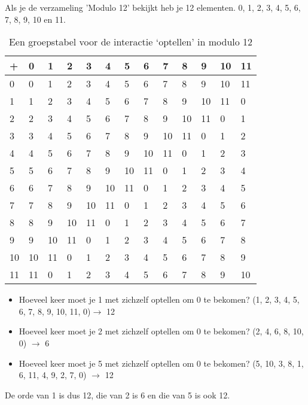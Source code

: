 \documentclass[12pt]{report}
\begin{document}
Als je de verzameling 'Modulo 12' bekijkt heb je 12 elementen. 0, 1, 2, 3, 4, 5, 6, 7, 8, 9, 10 en 11.
\begin{table}[]
\centering
\caption{Een groepstabel voor de interactie `optellen' in modulo 12}
\begin{tabular}{|l|llllllllllll}
\hline
+ & \multicolumn{1}{l|}{0} & \multicolumn{1}{l|}{1} & \multicolumn{1}{l|}{2} & \multicolumn{1}{l|}{3} & \multicolumn{1}{l|}{4} & \multicolumn{1}{l|}{5} & \multicolumn{1}{l|}{6} & \multicolumn{1}{l|}{7} & \multicolumn{1}{l|}{8} & \multicolumn{1}{l|}{9} & \multicolumn{1}{l|}{10} & \multicolumn{1}{l|}{11} \\ \hline
0 & 0 & 1 & 2 & 3 & 4 & 5 & 6 & 7 & 8 & 9 & 10 & 11 \\ \cline{1-1}
1 & 1 & 2 & 3 & 4 & 5 & 6 & 7 & 8 & 9 & 10 & 11 & 0 \\ \cline{1-1}
2 & 2 & 3 & 4 & 5 & 6 & 7 & 8 & 9 & 10 & 11 & 0 & 1 \\ \cline{1-1}
3 & 3 & 4 & 5 & 6 & 7 & 8 & 9 & 10 & 11 & 0 & 1 & 2 \\ \cline{1-1}
4 & 4 & 5 & 6 & 7 & 8 & 9 & 10 & 11 & 0 & 1 & 2 & 3 \\ \cline{1-1}
5 & 5 & 6 & 7 & 8 & 9 & 10 & 11 & 0 & 1 & 2 & 3 & 4 \\ \cline{1-1}
6 & 6 & 7 & 8 & 9 & 10 & 11 & 0 & 1 & 2 & 3 & 4 & 5 \\ \cline{1-1}
7 & 7 & 8 & 9 & 10 & 11 & 0 & 1 & 2 & 3 & 4 & 5 & 6 \\ \cline{1-1}
8 & 8 & 9 & 10 & 11 & 0 & 1 & 2 & 3 & 4 & 5 & 6 & 7 \\ \cline{1-1}
9 & 9 & 10 & 11 & 0 & 1 & 2 & 3 & 4 & 5 & 6 & 7 & 8 \\ \cline{1-1}
10 & 10 & 11 & 0 & 1 & 2 & 3 & 4 & 5 & 6 & 7 & 8 & 9  \\ \cline{1-1}
11 & 11 & 0 & 1 & 2 & 3 & 4 & 5 & 6 & 7 & 8 & 9 & 10 \\ \cline{1-1}
\end{tabular}
\label{table:groepstabel}
\end{table}
\begin{itemize}
 \item Hoeveel keer moet je 1 met zichzelf optellen om 0 te bekomen? (1, 2, 3, 4, 5, 6, 7, 8, 9, 10, 11, 0)$\rightarrow$ 12
 \item Hoeveel keer moet je 2 met zichzelf optellen om 0 te bekomen? (2, 4, 6, 8, 10, 0) $\rightarrow$ 6
 \item Hoeveel keer moet je 5 met zichzelf optellen om 0 te bekomen? (5, 10, 3, 8, 1, 6, 11, 4, 9, 2, 7, 0) $\rightarrow$ 12
\end{itemize}
De orde van 1 is dus 12, die van 2 is 6 en die van 5 is ook 12.
\end{document}
